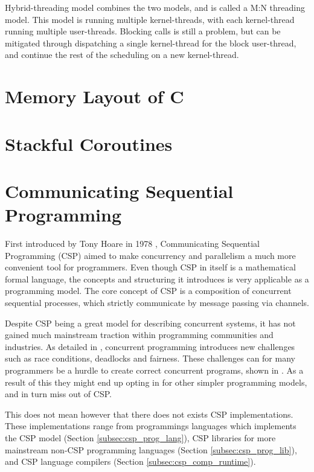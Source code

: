 Hybrid-threading model combines the two models, and is called a M:N threading model. This model is running multiple kernel-threads, with each kernel-thread running multiple user-threads. Blocking calls is still a problem, but can be mitigated through dispatching a single kernel-thread for the block user-thread, and continue the rest of the scheduling on a new kernel-thread. 


\section{Memory Layout of C}
\label{sec:memory_layout_c}




\section{Stackful Coroutines}
\label{sec:stackful_coroutines}




\section{Communicating Sequential Programming}
\label{sec:csp}

First introduced by Tony Hoare in 1978 \citep{csp}, Communicating Sequential Programming (CSP) aimed to make concurrency and parallelism a much more convenient tool for programmers. Even though CSP in itself is a mathematical formal language, the concepts and structuring it introduces is very applicable as a programming model. The core concept of CSP is a composition of concurrent sequential processes, which strictly communicate by message passing via channels.

Despite CSP being a great model for describing concurrent systems, it has not gained much mainstream traction within programming communities and industries. As detailed in \citet{benari2006}, concurrent programming introduces new challenges such as race conditions, deadlocks and fairness. These challenges can for many programmers be a hurdle to create correct concurrent programs, shown in \citet{ousterhour1996}. As a result of this they might end up opting in for other simpler programming models, and in turn miss out of CSP. 

This does not mean however that there does not exists CSP implementations. These implementations range from programmings languages which implements the CSP model (Section \ref{subsec:csp_prog_lang}), CSP libraries for more mainstream non-CSP programming languages (Section \ref{subsec:csp_prog_lib}), and CSP language compilers (Section \ref{subsec:csp_comp_runtime}).

